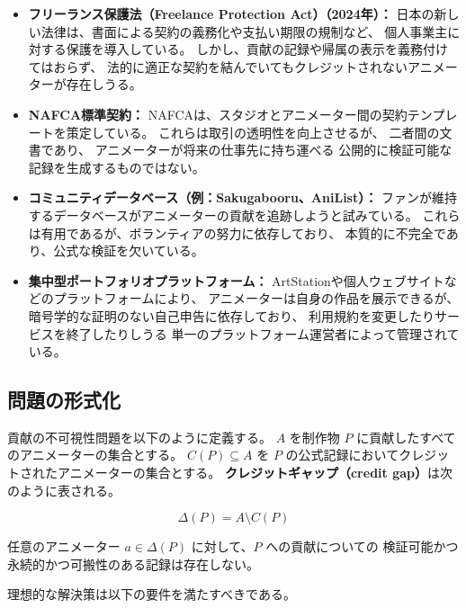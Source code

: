 \begin{itemize}
  \item \textbf{フリーランス保護法（Freelance Protection Act）（2024年）：}
    日本の新しい法律は、書面による契約の義務化や支払い期限の規制など、
    個人事業主に対する保護を導入している。
    しかし、貢献の記録や帰属の表示を義務付けてはおらず、
    法的に適正な契約を結んでいてもクレジットされないアニメーターが存在しうる。
  \item \textbf{NAFCA標準契約：}
    NAFCAは、スタジオとアニメーター間の契約テンプレートを策定している。
    これらは取引の透明性を向上させるが、
    二者間の文書であり、
    アニメーターが将来の仕事先に持ち運べる
    公開的に検証可能な記録を生成するものではない。
  \item \textbf{コミュニティデータベース（例：Sakugabooru、AniList）：}
    ファンが維持するデータベースがアニメーターの貢献を追跡しようと試みている。
    これらは有用であるが、ボランティアの努力に依存しており、
    本質的に不完全であり、公式な検証を欠いている。
  \item \textbf{集中型ポートフォリオプラットフォーム：}
    ArtStationや個人ウェブサイトなどのプラットフォームにより、
    アニメーターは自身の作品を展示できるが、
    暗号学的な証明のない自己申告に依存しており、
    利用規約を変更したりサービスを終了したりしうる
    単一のプラットフォーム運営者によって管理されている。
\end{itemize}

\subsection{問題の形式化}
\label{subsec:formalization}

貢献の不可視性問題を以下のように定義する。
$A$ を制作物 $P$ に貢献したすべてのアニメーターの集合とする。
$C(P) \subseteq A$ を $P$ の公式記録においてクレジットされたアニメーターの集合とする。
\textbf{クレジットギャップ（credit gap）}は次のように表される。

\begin{equation}
  \Delta(P) = A \setminus C(P)
  \label{eq:credit_gap}
\end{equation}

任意のアニメーター $a \in \Delta(P)$ に対して、$P$ への貢献についての
検証可能かつ永続的かつ可搬性のある記録は存在しない。

理想的な解決策は以下の要件を満たすべきである。

